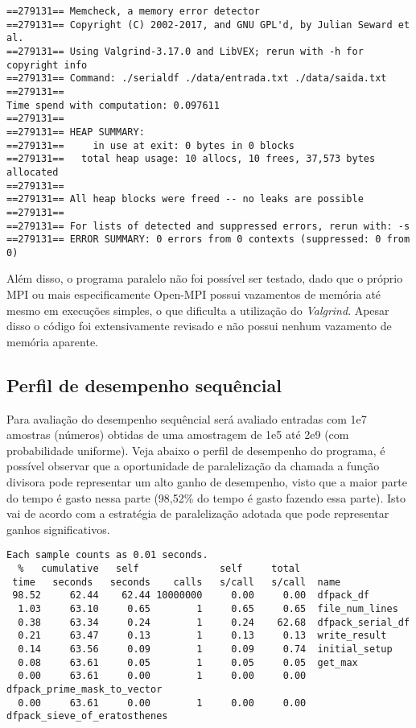 \documentclass{article}
\begin{document}
{
\scriptsize
\begin{verbatim}
==279131== Memcheck, a memory error detector
==279131== Copyright (C) 2002-2017, and GNU GPL'd, by Julian Seward et al.
==279131== Using Valgrind-3.17.0 and LibVEX; rerun with -h for copyright info
==279131== Command: ./serialdf ./data/entrada.txt ./data/saida.txt
==279131== 
Time spend with computation: 0.097611
==279131== 
==279131== HEAP SUMMARY:
==279131==     in use at exit: 0 bytes in 0 blocks
==279131==   total heap usage: 10 allocs, 10 frees, 37,573 bytes allocated
==279131== 
==279131== All heap blocks were freed -- no leaks are possible
==279131== 
==279131== For lists of detected and suppressed errors, rerun with: -s
==279131== ERROR SUMMARY: 0 errors from 0 contexts (suppressed: 0 from 0)
\end{verbatim}
}

Além disso, o programa paralelo não foi possível ser testado, dado que o próprio MPI ou mais especificamente Open-MPI possui vazamentos de memória até mesmo em execuções simples, o que dificulta a utilização do \textit{Valgrind}. Apesar disso o código foi extensivamente revisado e não possui nenhum vazamento de memória aparente.

\subsection{Perfil de desempenho sequêncial}

Para avaliação do desempenho sequêncial será avaliado entradas com 1e7 amostras (números) obtidas de uma amostragem de 1e5 até 2e9 (com probabilidade uniforme). Veja abaixo o perfil de desempenho do programa, é possível observar que a oportunidade de paralelização da chamada a função divisora pode representar um alto ganho de desempenho, visto que a maior parte do tempo é gasto nessa parte (98,52\% do tempo é gasto fazendo essa parte). Isto vai de acordo com a estratégia de paralelização adotada que pode representar ganhos significativos.

{
\scriptsize
\begin{verbatim}
Each sample counts as 0.01 seconds.
  %   cumulative   self              self     total           
 time   seconds   seconds    calls   s/call   s/call  name    
 98.52     62.44    62.44 10000000     0.00     0.00  dfpack_df
  1.03     63.10     0.65        1     0.65     0.65  file_num_lines
  0.38     63.34     0.24        1     0.24    62.68  dfpack_serial_df
  0.21     63.47     0.13        1     0.13     0.13  write_result
  0.14     63.56     0.09        1     0.09     0.74  initial_setup
  0.08     63.61     0.05        1     0.05     0.05  get_max
  0.00     63.61     0.00        1     0.00     0.00  dfpack_prime_mask_to_vector
  0.00     63.61     0.00        1     0.00     0.00  dfpack_sieve_of_eratosthenes
\end{verbatim}
}
\end{document}
